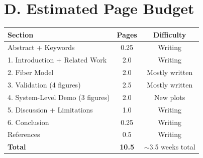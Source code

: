 \documentclass[11pt,a4paper]{article}
\begin{document}
\section{D. Estimated Page Budget}

\begin{table}[!ht]
  \begin{tabular}{l c c}
    \toprule
    \textbf{Section} & \textbf{Pages} & \textbf{Difficulty} \\
    \midrule
    Abstract + Keywords & 0.25 & Writing \\
    1. Introduction + Related Work & 2.0 & Writing \\
    2. Fiber Model & 2.0 & Mostly written \\
    3. Validation (4 figures) & 2.5 & Mostly written \\
    4. System-Level Demo (3 figures) & 2.0 & New plots \\
    5. Discussion + Limitations & 1.0 & Writing \\
    6. Conclusion & 0.25 & Writing \\
    References & 0.5 & Writing \\
    \midrule
    \textbf{Total} & \textbf{10.5} &
    $\sim$3.5 weeks total \\
    \bottomrule
  \end{tabular}
\end{table}

\par
\end{document}
